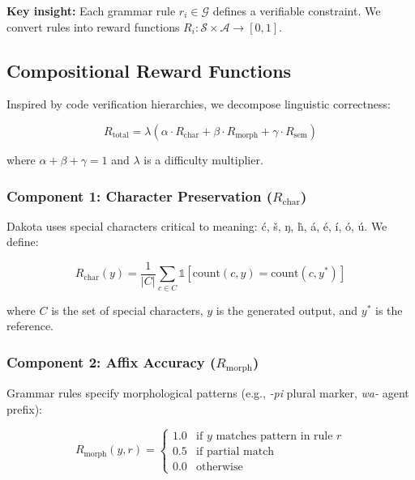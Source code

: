 \documentclass{article}
\newcommand{\Rchar}{R_{\text{char}}}
\newcommand{\Rmorph}{R_{\text{morph}}}
\newcommand{\Rsem}{R_{\text{sem}}}
\newcommand{\Rtotal}{R_{\text{total}}}
\begin{document}
\textbf{Key insight:} Each grammar rule $r_i \in \mathcal{G}$ defines a verifiable constraint. We convert rules into reward functions $R_i: \mathcal{S} \times \mathcal{A} \rightarrow [0,1]$.

\subsection{Compositional Reward Functions}

Inspired by code verification hierarchies, we decompose linguistic correctness:

\begin{equation}
\Rtotal = \lambda \left( \alpha \cdot \Rchar + \beta \cdot \Rmorph + \gamma \cdot \Rsem \right)
\end{equation}

where $\alpha + \beta + \gamma = 1$ and $\lambda$ is a difficulty multiplier.

\subsubsection{Component 1: Character Preservation ($\Rchar$)}

Dakota uses special characters critical to meaning: ć, š, ŋ, ḣ, á, é, í, ó, ú. We define:

\begin{equation}
\Rchar(y) = \frac{1}{|C|} \sum_{c \in C} \mathbb{1}[\text{count}(c, y) = \text{count}(c, y^*)]
\end{equation}

where $C$ is the set of special characters, $y$ is the generated output, and $y^*$ is the reference.

\subsubsection{Component 2: Affix Accuracy ($\Rmorph$)}

Grammar rules specify morphological patterns (e.g., \textit{-pi} plural marker, \textit{wa-} agent prefix):

\begin{equation}
\Rmorph(y, r) = \begin{cases} 
1.0 & \text{if } y \text{ matches pattern in rule } r \\
0.5 & \text{if partial match} \\
0.0 & \text{otherwise}
\end{cases}
\end{equation}
\end{document}
